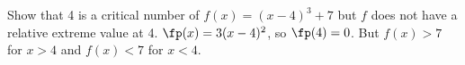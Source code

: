 {Show that 4 is a critical number of $f(x)=(x-4)^3+7$ but $f$ does not have a relative extreme value at 4.}
{$\fp(x)=3(x-4)^2$, so $\fp(4)=0$.  But $f(x)>7$ for $x>4$ and $f(x)<7$ for $x<4$.}
